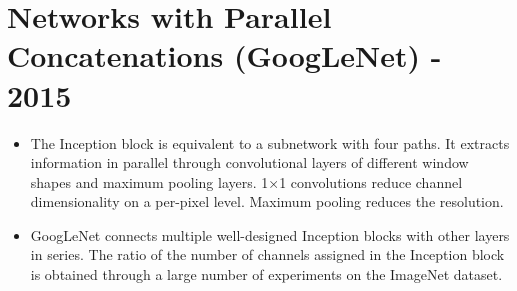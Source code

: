 \documentclass[12pt,notitlepage]{article}
\begin{document}
\section{ Networks with Parallel Concatenations (GoogLeNet) - 2015 }
\begin{itemize}
  \item The Inception block is equivalent to a subnetwork with four paths. It extracts information in parallel through convolutional layers of different window shapes and maximum pooling layers.  1×1  convolutions reduce channel dimensionality on a per-pixel level. Maximum pooling reduces the resolution.
  \item GoogLeNet connects multiple well-designed Inception blocks with other layers in series. The ratio of the number of channels assigned in the Inception block is obtained through a large number of experiments on the ImageNet dataset.
\end{itemize}



\vfill

\nocite{zhang2020dive}
\end{document}
